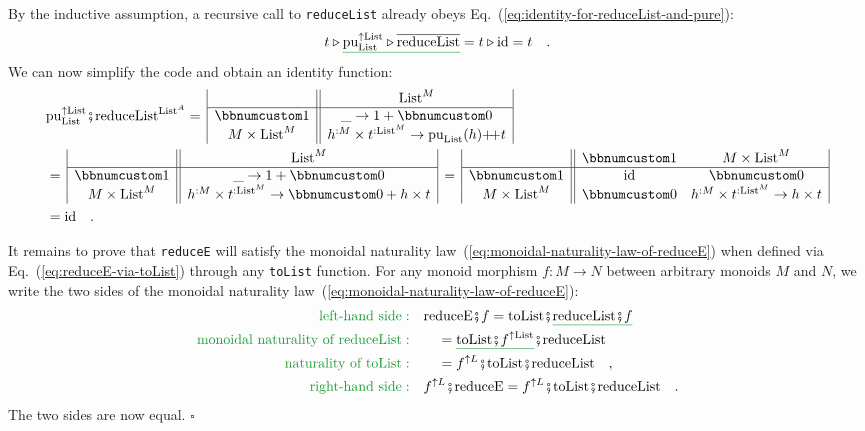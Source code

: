 By the inductive assumption, a recursive call to \lstinline!reduceList!
already obeys Eq.~(\ref{eq:identity-for-reduceList-and-pure}):
\[
t\triangleright\gunderline{\text{pu}_{\text{List}}^{\uparrow\text{List}}\triangleright\overline{\text{reduceList}}}=t\triangleright\text{id}=t\quad.
\]
We can now simplify the code and obtain an identity function:
\begin{align*}
 & \text{pu}_{\text{List}}^{\uparrow\text{List}}\bef\text{reduceList}^{\text{List}^{A}}=\,\begin{array}{|c||c|}
 & \text{List}^{M}\\
\hline \bbnum 1 & \_\rightarrow1+\bbnum 0\\
M\times\text{List}^{M} & h^{:M}\times t^{:\text{List}^{M}}\rightarrow\text{pu}_{\text{List}}(h)\pplus t
\end{array}\\
 & =\,\begin{array}{|c||c|}
 & \text{List}^{M}\\
\hline \bbnum 1 & \_\rightarrow1+\bbnum 0\\
M\times\text{List}^{M} & h^{:M}\times t^{:\text{List}^{M}}\rightarrow\bbnum 0+h\times t
\end{array}\,=\,\begin{array}{|c||cc|}
 & \bbnum 1 & M\times\text{List}^{M}\\
\hline \bbnum 1 & \text{id} & \bbnum 0\\
M\times\text{List}^{M} & \bbnum 0 & h^{:M}\times t^{:\text{List}^{M}}\rightarrow h\times t
\end{array}\\
 & =\text{id}\quad.
\end{align*}

It remains to prove that \lstinline!reduceE! will satisfy the monoidal
naturality law~(\ref{eq:monoidal-naturality-law-of-reduceE}) when
defined via Eq.~(\ref{eq:reduceE-via-toList}) through any \lstinline!toList!
function. For any monoid morphism $f:M\rightarrow N$ between arbitrary
monoids $M$ and $N$, we write the two sides of the monoidal naturality
law~(\ref{eq:monoidal-naturality-law-of-reduceE}):
\begin{align*}
{\color{greenunder}\text{left-hand side}:}\quad & \text{reduceE}\bef f=\text{toList}\bef\gunderline{\text{reduceList}\bef f}\\
{\color{greenunder}\text{monoidal naturality of }\text{reduceList}:}\quad & \quad=\gunderline{\text{toList}\bef f^{\uparrow\text{List}}}\bef\text{reduceList}\\
{\color{greenunder}\text{naturality of }\text{toList}:}\quad & \quad=f^{\uparrow L}\bef\text{toList}\bef\text{reduceList}\quad,\\
{\color{greenunder}\text{right-hand side}:}\quad & f^{\uparrow L}\bef\text{reduceE}=f^{\uparrow L}\bef\text{toList}\bef\text{reduceList}\quad.
\end{align*}
The two sides are now equal. $\square$

